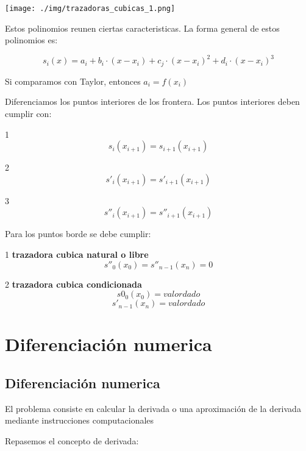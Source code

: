 \documentclass[10pt]{article}
\begin{document}
\texttt{[image: ./img/trazadoras\_cubicas\_1.png]}

Estos polinomios reunen ciertas caracteristicas. La forma general de estos polinomios es:

\begin{equation}
	s_i(x) = a_i + b_i \cdot (x-x_i) + c_j \cdot (x-x_i)^2 + d_i \cdot (x-x_i)^3
\end{equation}

Si comparamos con Taylor, entonces $a_i = f(x_i)$

Diferenciamos los puntos interiores de los frontera. Los puntos interiores deben cumplir con:

1
\begin{equation}
	s_i(x_{i+1}) = s_{i+1}(x_{i+1})
\end{equation}

2
\begin{equation}
	s'_i(x_{i+1}) = s'_{i+1}(x_{i+1})
\end{equation}

3
\begin{equation}
	s''_i(x_{i+1}) = s''_{i+1}(x_{i+1})
\end{equation}

Para los puntos borde se debe cumplir:

1 \textbf{trazadora cubica natural o libre}
\begin{equation}
	s''_0(x_0) = s''_{n-1}(x_n) = 0	
\end{equation}

2 \textbf{trazadora cubica condicionada}
\begin{equation}
	s0_0(x_0) = valor dado
\end{equation}
\begin{equation}
	s'_{n-1}(x_n) = valor dado
\end{equation}

\section{Diferenciación numerica}

\subsection{Diferenciación numerica}

El problema consiste en calcular la derivada o una aproximación
de la derivada mediante instrucciones computacionales

Repasemos el concepto de derivada:
\end{document}

